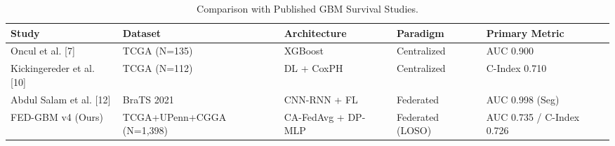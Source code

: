 \begin{table}
\caption{Comparison with Published GBM Survival Studies.}
\label{tab:table2}
\begin{tabular}{lllll}
\toprule
Study & Dataset & Architecture & Paradigm & Primary Metric \\
\midrule
Oncul et al. [7] & TCGA (N=135) & XGBoost & Centralized & AUC 0.900 \\
Kickingereder et al. [10] & TCGA (N=112) & DL + CoxPH & Centralized & C-Index 0.710 \\
Abdul Salam et al. [12] & BraTS 2021 & CNN-RNN + FL & Federated & AUC 0.998 (Seg) \\
FED-GBM v4 (Ours) & TCGA+UPenn+CGGA (N=1,398) & CA-FedAvg + DP-MLP & Federated (LOSO) & AUC 0.735 / C-Index 0.726 \\
\bottomrule
\end{tabular}
\end{table}
